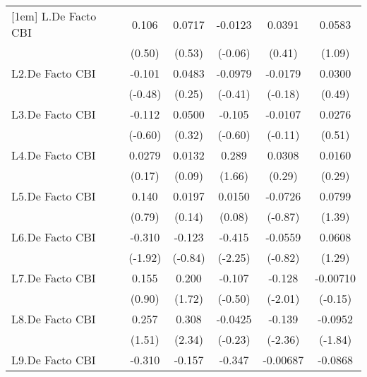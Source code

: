 {\begin{longtable}{l*{5}{c}}
[1em]
L.De Facto CBI  &    0.106         &   0.0717         &  -0.0123         &   0.0391         &   0.0583         \\
                &   (0.50)         &   (0.53)         &  (-0.06)         &   (0.41)         &   (1.09)         \\
[1em]
L2.De Facto CBI &   -0.101         &   0.0483         &  -0.0979         &  -0.0179         &   0.0300         \\
                &  (-0.48)         &   (0.25)         &  (-0.41)         &  (-0.18)         &   (0.49)         \\
[1em]
L3.De Facto CBI &   -0.112         &   0.0500         &   -0.105         &  -0.0107         &   0.0276         \\
                &  (-0.60)         &   (0.32)         &  (-0.60)         &  (-0.11)         &   (0.51)         \\
[1em]
L4.De Facto CBI &   0.0279         &   0.0132         &    0.289         &   0.0308         &   0.0160         \\
                &   (0.17)         &   (0.09)         &   (1.66)         &   (0.29)         &   (0.29)         \\
[1em]
L5.De Facto CBI &    0.140         &   0.0197         &   0.0150         &  -0.0726         &   0.0799         \\
                &   (0.79)         &   (0.14)         &   (0.08)         &  (-0.87)         &   (1.39)         \\
[1em]
L6.De Facto CBI &   -0.310         &   -0.123         &   -0.415\sym{*}  &  -0.0559         &   0.0608         \\
                &  (-1.92)         &  (-0.84)         &  (-2.25)         &  (-0.82)         &   (1.29)         \\
[1em]
L7.De Facto CBI &    0.155         &    0.200         &   -0.107         &   -0.128\sym{*}  & -0.00710         \\
                &   (0.90)         &   (1.72)         &  (-0.50)         &  (-2.01)         &  (-0.15)         \\
[1em]
L8.De Facto CBI &    0.257         &    0.308\sym{*}  &  -0.0425         &   -0.139\sym{*}  &  -0.0952         \\
                &   (1.51)         &   (2.34)         &  (-0.23)         &  (-2.36)         &  (-1.84)         \\
[1em]
L9.De Facto CBI &   -0.310         &   -0.157         &   -0.347\sym{*}  & -0.00687         &  -0.0868         \\

\end{longtable}}
